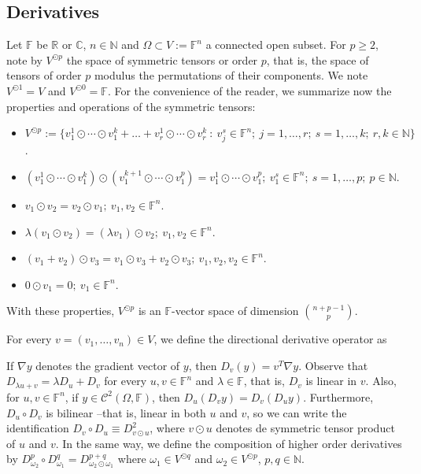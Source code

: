 \documentclass[a4paper,12pt,onecolumn]{article}
\theoremstyle{ptheorem}
\theoremstyle{hdef}
\theoremstyle{premark}
\numberwithin{equation}{section}
\numberwithin{figure}{section}
\newcommand{\cC}{{\mathcal C}}
\newcommand{\bC}{{\mathbb C}}
\newcommand{\bF}{{\mathbb F}}
\newcommand{\bN}{{\mathbb N}}
\newcommand{\bR}{{\mathbb R}}
\renewcommand{\l}{\lambda}
\newcommand{\<}{\langle}
\renewcommand{\>}{\rangle}
\renewcommand{\<}{\left<}
\renewcommand{\>}{\right>}
\renewcommand{\(}{\left(}
\renewcommand{\)}{\right)}
\begin{document}
\subsection{Derivatives}
Let $\bF$ be $\bR$ or $\bC$, $n\in\bN$ and $\Omega\subset V:=\bF^n$ a connected open subset. For $p\ge 2$, note by $V^{\odot p}$ the space of symmetric tensors or order $p$, that is, the space of tensors of order $p$ modulus the permutations of their components.  We note $V^{\odot 1}=V$ and $V^{\odot 0}=\bF$. For the convenience of the reader, we summarize now the properties and operations of the symmetric tensors:
\begin{itemize}
\item $V^{\odot p}:=\{v_1^1\odot \cdots\odot v^k_1+\dots +v_r^1\odot \cdots\odot v^k_r\ :\ v_j^s\in\bF^n;\ j=1,\dots,r;\ s=1,\dots,k;\ r,k\in\bN\}$.
\item $(v_1^1\odot \cdots\odot v^k_1)\odot(v_1^{k+1}\odot \cdots\odot v^p_1)=v_1^1\odot \cdots\odot v^p_1;\ v_1^s\in\bF^n;\ s=1,\dots,p;\ p\in\bN$.
\item $v_1\odot v_2=v_2\odot v_1;\ v_1,v_2\in\bF^n$.
\item $\l(v_1\odot v_2)=(\l v_1)\odot v_2;\ v_1,v_2\in\bF^n$.
\item $(v_1+v_2)\odot v_3=v_1\odot v_3+v_2\odot v_3;\ v_1,v_2,v_2\in\bF^n$.
\item $0\odot v_1=0;\ v_1\in\bF^n$.
\end{itemize}
With these properties, $V^{\odot p}$ is an $\bF$-vector space of dimension ${n + p - 1 \choose p}$.\par

 For every $v=(v_1,\dots,v_n)\in V$, we define the directional derivative operator as
\begin{center}
\end{center}
If $\nabla y$ denotes the gradient vector of $y$, then $D_v(y)=v^T\nabla y$. Observe that $D_{\l u+v}=\l D_u+D_v$ for every $u,v\in\bF^n$ and $\l\in\bF$, that is, $D_v$ is linear in $v$. Also, for $u,v\in\bF^n$, if $y\in\cC^2(\Omega,\bF)$, then $D_u(D_v y)=D_v(D_u y)$. Furthermore, $D_u\circ D_v$ is bilinear --that is, linear in both $u$ and $v$, so we can write the identification $D_v\circ D_u\equiv D^2_{v\odot u}$, where $v\odot u$ denotes de symmetric tensor product of $u$ and $v$. In the same way, we define the composition of higher order derivatives by $D^p_{\omega_2}\circ D^q_{\omega_1}=D^{p+q}_{\omega_2\odot \omega_1}$ where $\omega_1\in V^{\odot q}$ and $\omega_2\in V^{\odot p}$, $p,q\in\bN$.\par
\end{document}

